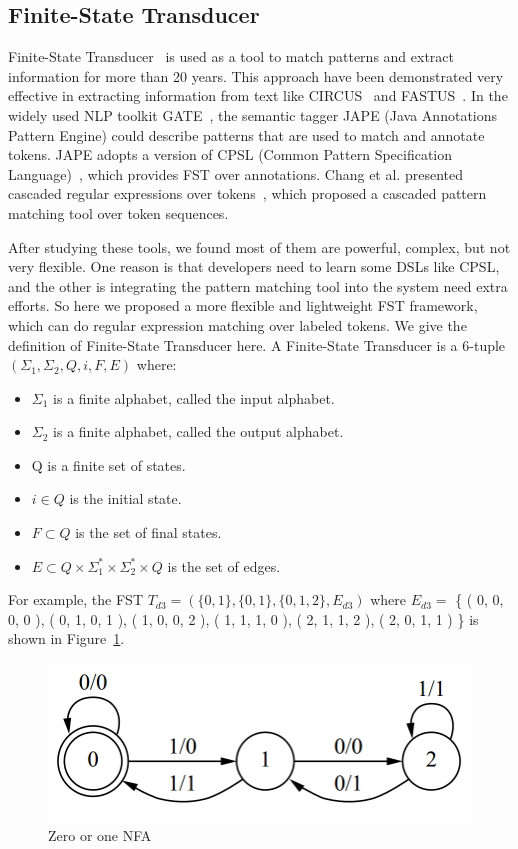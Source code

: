 \subsection{Finite-State Transducer}
Finite-State Transducer~\cite{roche1997finite} is used as a tool to match patterns and extract information for more than 20 years. This approach have been demonstrated very effective in extracting information from text like CIRCUS~\cite{lehnert1991university} and FASTUS~\cite{hobbs199713}.  In the widely used NLP toolkit GATE~\cite{cunningham2002framework}, the semantic tagger JAPE (Java Annotations Pattern Engine) could describe patterns that are used to match and annotate tokens. JAPE adopts a version of CPSL (Common Pattern  Specification Language)~\cite{appelt1998common}, which provides FST over annotations. Chang et al. presented cascaded regular expressions over tokens~\cite{chang2014tokensregex}, which proposed a cascaded pattern matching tool over token sequences.

After studying these tools, we found most of them are powerful, complex, but not very flexible. One reason is that developers need to learn some DSLs like CPSL, and the other is  integrating the pattern matching tool into the system need extra efforts. So here we proposed a more flexible and lightweight FST framework, which can do regular expression matching over labeled tokens. We give the definition of Finite-State Transducer here. A Finite-State Transducer is a 6-tuple $(\Sigma_1, \Sigma_2, Q, i, F, E)$ where:
\begin{itemize}
  \item $\Sigma_1$ is a finite alphabet, called the input alphabet.
  \item $\Sigma_2$ is a finite alphabet, called the output alphabet.
  \item Q is a finite set of states.
  \item $i \in Q$ is the initial state.
  \item $F \subset Q$ is the set of final states.
  \item $E \subset  Q  \times \Sigma_1^* \times \Sigma_2^* \times Q$ is the set of edges.
\end{itemize}


For example, the FST $T_{d3} = \left(     \{ 0, 1 \} ,  \{ 0, 1 \} , \{ 0, 1 , 2 \} ,  E_{d3} \right ) $ where $E_{d3} = $ \{ ( 0, 0, 0, 0 ),   ( 0, 1, 0, 1 ), ( 1, 0, 0, 2 ), ( 1, 1, 1, 0 ), ( 2, 1, 1, 2 ), ( 2, 0, 1, 1 ) \}  is shown in Figure~\ref{fig:fst}.


\begin{figure}[htbp]
  \centering
  \includegraphics[scale=0.4]{images/fst.png}
  \caption{Zero or one NFA}
  \label{fig:fst}
\end{figure}


